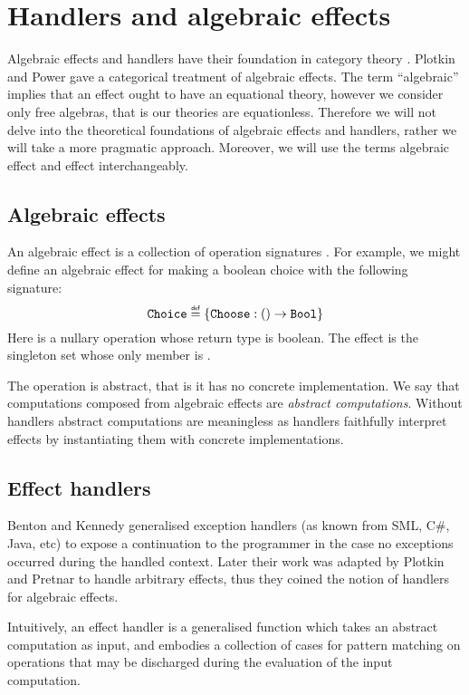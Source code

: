 \section{Handlers and algebraic effects}\label{sec:handlers-and-effects}
Algebraic effects and handlers have their foundation in category theory \cite{Plotkin2001a,Plotkin2013}. Plotkin and Power \cite{Plotkin2001b,Plotkin2001a} gave a categorical treatment of algebraic effects. The term ``algebraic'' implies that an effect ought to have an equational theory, however we consider only free algebras, that is our theories are equationless. Therefore we will not delve into the theoretical foundations of algebraic effects and handlers, rather we will take a more pragmatic approach. Moreover, we will use the terms algebraic effect and effect interchangeably.

\subsection{Algebraic effects}
An algebraic effect is a collection of operation signatures \cite{Lindley2014}. For example, we might define an algebraic effect  for making a boolean choice with the following signature:
\[ \type{Choice} \defas \{ \type{Choose}: () \to \type{Bool} \} \]
Here  is a nullary operation whose return type is boolean. The effect  is the singleton set whose only member is . 

The operation  is abstract, that is it has no concrete implementation. We say that computations composed from algebraic effects are \emph{abstract computations}. Without handlers abstract computations are meaningless as handlers faithfully interpret effects by instantiating them with concrete implementations. 

\subsection{Effect handlers}
Benton and Kennedy generalised exception handlers \cite{Benton2001} (as known from SML, C\#, Java, etc) to expose a continuation to the programmer in the case no exceptions occurred during the handled context. Later their work was adapted by Plotkin and Pretnar \cite{Plotkin2013} to handle arbitrary effects, thus they coined the notion of handlers for algebraic effects.

Intuitively, an effect handler is a generalised function which takes an abstract computation as input, and embodies a collection of cases for pattern matching on operations that may be discharged during the evaluation of the input computation.

